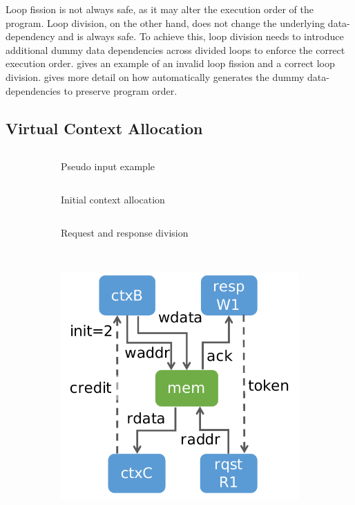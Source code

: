 Loop fission is not always safe, as it may alter the execution order of the program.
Loop division, on the other hand, does not change the underlying data-dependency and is always safe.
To achieve this, loop division needs to introduce additional dummy data dependencies across divided
loops to enforce the correct execution order.
 gives an example of an invalid loop fission and a correct loop division.
 gives more detail on how \name automatically generates the dummy
data-dependencies to preserve program order.

\subsection{Virtual Context Allocation} 

\begin{figure}
\centering
\begin{subfigure}[b]{0.4\textwidth}
\inputminted{python}{code/spatialeg.py}
\caption{Pseudo input example}
\label{fig:contexteg}
\inputminted{python}{code/contextalloc.py}
\caption{Initial context allocation}
\end{subfigure}
\hfill
\begin{subfigure}[b]{0.5\textwidth}
\inputminted{python}{code/contextsplit.py}
\caption{Request and response division}
\end{subfigure} \\
\vspace{0.2cm}
\begin{subfigure}[b]{0.23\textwidth}
\includegraphics[width=1\textwidth]{figs/ctxdag.pdf}

\end{subfigure}
\end{figure}
